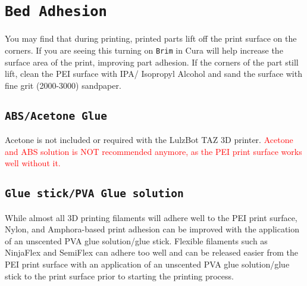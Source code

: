 
\section{\texttt{Bed Adhesion}}
You may find that during printing, printed parts lift off the print surface on the corners. If you are seeing this turning on \texttt{Brim} in Cura will help increase the surface area of the print, improving part adhesion. If the corners of the part still lift, clean the PEI surface with IPA/ Isopropyl Alcohol and sand the surface with fine grit (2000-3000) sandpaper. 


\subsection{\texttt{ABS/Acetone Glue}}
\label{sec:ABS/Acetone Glue}

Acetone is not included or required with the LulzBot TAZ 3D printer. \textcolor{red}{Acetone and ABS solution is NOT recommended anymore, as the PEI print surface works well without it.}

\subsection{\texttt{Glue stick/PVA Glue solution}}
\label{sec:Glue stick/PVA Glue solution}
 While almost all 3D printing filaments will adhere well to the PEI print surface, Nylon, and Amphora\textsuperscript{\miniscule{\texttrademark}}-based print adhesion can be improved with the application of an unscented PVA glue solution/glue stick. Flexible filaments such as NinjaFlex\textsuperscript{\miniscule{\textregistered}} and SemiFlex\textsuperscript{\miniscule{\texttrademark}} can adhere too well and can be released easier from the PEI print surface with an application of an unscented PVA glue solution/glue stick to the print surface prior to starting the printing process.

